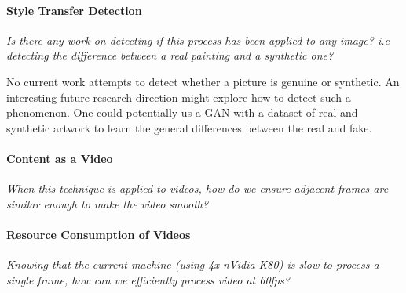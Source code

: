 \documentclass{article}
\begin{document}
\paragraph{Style Transfer Detection} \textit{Is there any work on detecting
if this process has been applied to any image? i.e detecting the difference
between a real painting and a synthetic one?}

No current work attempts to detect whether a picture is genuine or synthetic.
An interesting future research direction might explore how to detect such a
phenomenon. One could potentially us a \ac{GAN} with a dataset of real and
synthetic artwork to learn the general differences between the real and fake.

\paragraph{Content as a Video} \textit{When this technique is applied to
videos, how do we ensure adjacent frames are similar enough to make the video
smooth?}


\paragraph{Resource Consumption of Videos} \textit{Knowing that the current
machine (using 4x nVidia K80) is slow to process a single frame, how can we
efficiently process video at 60fps?}








\end{document}

